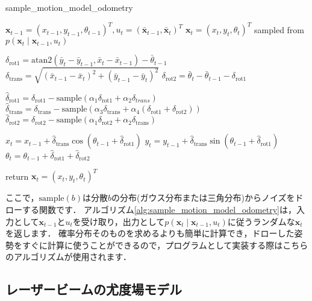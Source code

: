 \documentclass[{../../master}]{subfiles}
\begin{document}
\begin{algorithm}
  \caption{sample\_motion\_model\_odometry}
  \label{alg:sample_motion_model_odometry}
  \begin{algorithmic}[1]
    \REQUIRE $\bm{x}_{t-1} = (x_{t-1}, y_{t-1}, \theta_{t-1})^{T}, u_{t} = (\bar{\bm{x}}_{t-1}, \bar{\bm{x}}_{t})^{T}$
    \ENSURE $\bm{x}_{t} = (x_{t}, y_{t}, \theta_{t})^{T}$ sampled from $p(\bm{x}_{t} \mid \bm{x}_{t-1}, u_{t})$

    \STATE $\delta_{\text{rot1}} = \text{atan2}(\bar{y}_{t} - \bar{y}_{t-1}, \bar{x}_{t} - \bar{x}_{t-1}) - \bar{\theta}_{t-1}$
    \STATE $\delta_{\text{trans}} = \sqrt{(\bar{x}_{t-1} - \bar{x}_{t})^2 + (\bar{y}_{t-1} - \bar{y}_{t})^2}$
    \STATE $\delta_{\text{rot2}} = \bar{\theta}_{t} - \bar{\theta}_{t-1} - \delta_{\text{rot1}}$

    \STATE $\hat{\delta}_{\text{rot1}} = \delta_{\text{rot1}} - \text{sample}(\alpha_1 \delta_{\text{rot1}} + \alpha_2 \delta_{trans})$
    \STATE $\hat{\delta}_{\text{trans}} = \delta_{\text{trans}} - \text{sample}(\alpha_3 \delta_{\text{trans}} + \alpha_4(\delta_{\text{rot1}} + \delta_{\text{rot2}}))$
    \STATE $\hat{\delta}_{\text{rot2}} = \delta_{\text{rot2}} - \text{sample}(\alpha_1 \delta_{\text{rot2}} + \alpha_2 \delta_{\text{trans}})$

    \STATE $x_{t} = x_{t-1} + \hat{\delta}_{\text{trans}} \cos(\theta_{t-1} + \hat{\delta}_{\text{rot1}})$
    \STATE $y_{t} = y_{t-1} + \hat{\delta}_{\text{trans}} \sin(\theta_{t-1} + \hat{\delta}_{\text{rot1}})$
    \STATE $\theta_{t} = \theta_{t-1} + \hat{\delta}_{\text{rot1}} + \hat{\delta}_{\text{rot2}}$

    \STATE return $\bm{x}_{t} = (x_{t}, y_{t}, \theta_{t})^T$
  \end{algorithmic}
\end{algorithm}

ここで，$\text{sample}(b)$は分散$b$の分布(ガウス分布または三角分布)からノイズをドローする関数です．
アルゴリズム\ref{alg:sample_motion_model_odometry}は，入力として$\bm{x}_{t-1}$と$u_{t}$を受け取り，出力として$p(\bm{x}_{t} \mid \bm{x}_{t-1}, u_{t})$に従うランダムな$\bm{x}_{t}$を返します．
確率分布そのものを求めるよりも簡単に計算でき，ドローした姿勢をすぐに計算に使うことができるので，プログラムとして実装する際はこちらのアルゴリズムが使用されます．

\subsection{レーザービームの尤度場モデル}
\label{sec:likelihood_field_model}
\end{document}
